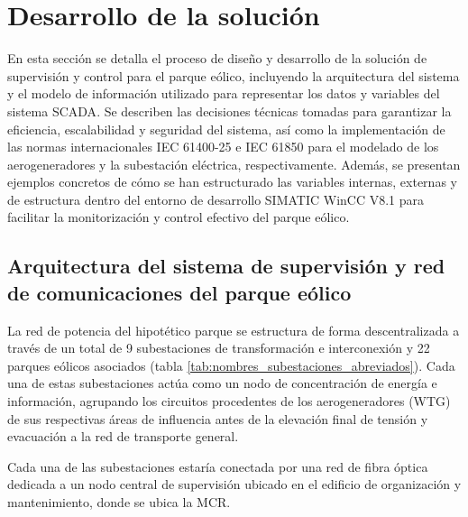 \chapter{Desarrollo de la solución}
\label{cap:desarrollo_de_la_solucion}
En esta sección se detalla el proceso de diseño y desarrollo de la solución de supervisión y control para el parque eólico, incluyendo la arquitectura del sistema y el modelo de información utilizado para representar los datos y variables del sistema \ac{SCADA}. Se describen las decisiones técnicas tomadas para garantizar la eficiencia, escalabilidad y seguridad del sistema, así como la implementación de las normas internacionales IEC 61400-25 e IEC 61850 para el modelado de los aerogeneradores y la subestación eléctrica, respectivamente. Además, se presentan ejemplos concretos de cómo se han estructurado las variables internas, externas y de estructura dentro del entorno de desarrollo SIMATIC WinCC V8.1 para facilitar la monitorización y control efectivo del parque eólico.
\section{Arquitectura del sistema de supervisión y red de comunicaciones del parque eólico}
\label{sec:arquitectura_parque_eolico}

La red de potencia del hipotético parque se estructura de forma descentralizada a través de un total de 9 subestaciones de transformación e interconexión y 22 parques eólicos asociados (tabla \ref{tab:nombres_subestaciones_abreviados}). Cada una de estas subestaciones actúa como un nodo de concentración de energía e información, agrupando los circuitos procedentes de los aerogeneradores (\ac{WTG}) de sus respectivas áreas de influencia antes de la elevación final de tensión y evacuación a la red de transporte general.\par

Cada una de las subestaciones estaría conectada por una red de fibra óptica dedicada a un nodo central de supervisión ubicado en el edificio de organización y mantenimiento, donde se ubica la \ac{MCR}. 

